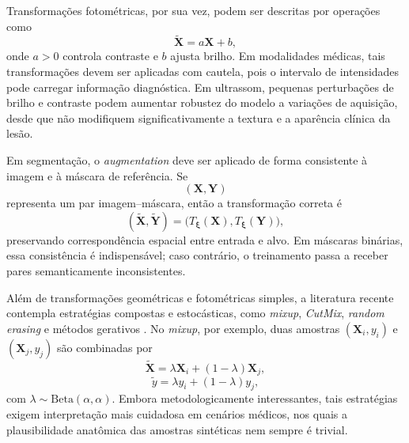 \documentclass[tcc,capa]{texufpel}
\begin{document}
Transformações fotométricas, por sua vez, podem ser descritas por operações como
\begin{equation}
	\tilde{\mathbf{X}} = a\mathbf{X} + b,
\end{equation}
onde \(a>0\) controla contraste e \(b\) ajusta brilho. Em modalidades médicas, tais transformações devem ser aplicadas com cautela, pois o intervalo de intensidades pode carregar informação diagnóstica. Em ultrassom, pequenas perturbações de brilho e contraste podem aumentar robustez do modelo a variações de aquisição, desde que não modifiquem significativamente a textura e a aparência clínica da lesão.

Em segmentação, o \textit{augmentation} deve ser aplicado de forma consistente à imagem e à máscara de referência. Se
\begin{equation}
	(\mathbf{X}, \mathbf{Y})
\end{equation}
representa um par imagem--máscara, então a transformação correta é
\begin{equation}
	(\tilde{\mathbf{X}}, \tilde{\mathbf{Y}})
	=
	\big(T_{\boldsymbol{\xi}}(\mathbf{X}), T_{\boldsymbol{\xi}}(\mathbf{Y})\big),
\end{equation}
preservando correspondência espacial entre entrada e alvo. Em máscaras binárias, essa consistência é indispensável; caso contrário, o treinamento passa a receber pares semanticamente inconsistentes.

Além de transformações geométricas e fotométricas simples, a literatura recente contempla estratégias compostas e estocásticas, como \textit{mixup}, \textit{CutMix}, \textit{random erasing} e métodos gerativos \cite{Shorten2019,Yang2022AugSurvey}. No \textit{mixup}, por exemplo, duas amostras \((\mathbf{X}_i, y_i)\) e \((\mathbf{X}_j, y_j)\) são combinadas por
\begin{equation}
	\tilde{\mathbf{X}} = \lambda \mathbf{X}_i + (1-\lambda)\mathbf{X}_j,
\end{equation}
\begin{equation}
	\tilde{y} = \lambda y_i + (1-\lambda)y_j,
\end{equation}
com \(\lambda \sim \mathrm{Beta}(\alpha,\alpha)\). Embora metodologicamente interessantes, tais estratégias exigem interpretação mais cuidadosa em cenários médicos, nos quais a plausibilidade anatômica das amostras sintéticas nem sempre é trivial.
\end{document}
